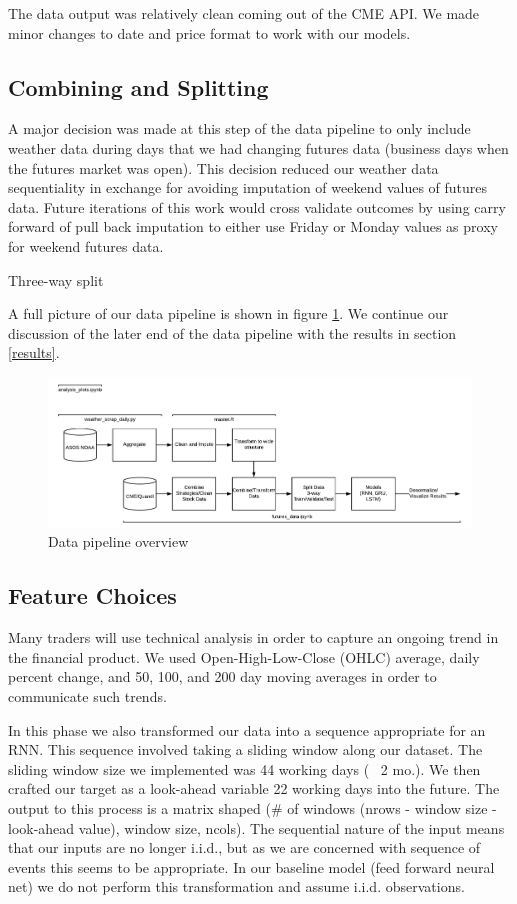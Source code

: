 \documentclass[twoside,11pt]{article}
\begin{document}
The data output was relatively clean coming out of the CME API. We made minor changes to date and price format to work with our models.

\subsection{Combining and Splitting}

A major decision was made at this step of the data pipeline to only include weather data during days that we had changing futures data (business days when the futures market was open). This decision reduced our weather data sequentiality in exchange for avoiding imputation of weekend values of futures data. Future iterations of this work would cross validate outcomes by using carry forward of pull back imputation to either use Friday or Monday values as proxy for weekend futures data. 

Three-way split

A full picture of our data pipeline is shown in figure \ref{fig:datapipeline}. We continue our discussion of the later end of the data pipeline with the results in section \ref{results}.

\begin{figure}[htbp]
	\centering
	\includegraphics[width=5in]{DataPipeline.png}
	\caption{Data pipeline overview}
	\label{fig:datapipeline}
\end{figure}


\subsection{Feature Choices}

Many traders will use technical analysis in order to capture an ongoing trend in the financial product. We used Open-High-Low-Close (OHLC) average, daily percent change, and 50, 100, and 200 day moving averages in order to communicate such trends.  

In this phase we also transformed our data into a sequence appropriate for an RNN. This sequence involved taking a sliding window along our dataset. The sliding window size we implemented was 44 working days (~ 2 mo.). We then crafted our target as a look-ahead variable 22 working days into the future. The output to this process is a matrix shaped (\# of windows (nrows - window size - look-ahead value), window size, ncols). The sequential nature of the input means that our inputs are no longer i.i.d., but as we are concerned with sequence of events this seems to be appropriate. In our baseline model (feed forward neural net) we do not perform this transformation and assume i.i.d. observations. 
\end{document}

